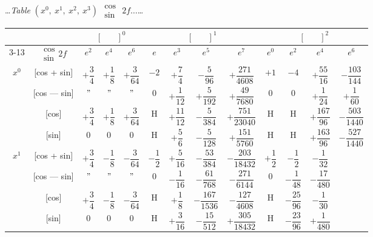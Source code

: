 \documentclass[10pt,a4paper]{article}
\newcommand{\tabletitle}[2]{%
  \begin{center}
  \ldots\textit{Table} #1 $\displaystyle\begin{smallmatrix} \cos \\ \sin \end{smallmatrix}$ #2\ldots
  \end{center}
}
\begin{document}
\vspace{1em}

\tabletitle{$(x^0,\ x^1,\ x^2,\ x^3)$}{$2f\ldots$}

\begin{center}
\small
\begin{tabular}{|c|c|c|c|c|c|c|c|c|c|c|c|c|}
\hline
& & \multicolumn{3}{c|}{$[\phantom{()}]^0$} & \multicolumn{4}{c|}{$[\phantom{()}]^1$} & \multicolumn{4}{c|}{$[\phantom{()}]^2$} \\
\cline{3-13}
& $\begin{smallmatrix} \cos \\ \sin \end{smallmatrix} 2f$ & $e^2$ & $e^4$ & $e^6$ & $e$ & $e^3$ & $e^5$ & $e^7$ & $e^0$ & $e^2$ & $e^4$ & $e^6$ \\
\hline
\multirow{4}{*}{$x^0$} & [cos + sin] & $+\dfrac{3}{4}$ & $+\dfrac{1}{8}$ & $+\dfrac{3}{64}$ & $-2$ & $+\dfrac{7}{4}$ & $-\dfrac{5}{96}$ & $+\dfrac{271}{4608}$ & $+1$ & $-4$ & $+\dfrac{55}{16}$ & $-\dfrac{103}{144}$ \\
& [cos --- sin] & $"$ & $"$ & $"$ & $0$ & $+\dfrac{1}{12}$ & $+\dfrac{5}{192}$ & $+\dfrac{49}{7680}$ & $0$ & $0$ & $+\dfrac{1}{24}$ & $+\dfrac{1}{60}$ \\
& [cos] & $+\dfrac{3}{4}$ & $+\dfrac{1}{8}$ & $+\dfrac{3}{64}$ & H & $+\dfrac{11}{12}$ & $-\dfrac{5}{384}$ & $+\dfrac{751}{23040}$ & H & H & $+\dfrac{167}{96}$ & $-\dfrac{503}{1440}$ \\
& [sin] & $0$ & $0$ & $0$ & H & $+\dfrac{5}{6}$ & $-\dfrac{5}{128}$ & $+\dfrac{151}{5760}$ & H & H & $+\dfrac{163}{96}$ & $-\dfrac{527}{1440}$ \\
\hline
\multirow{4}{*}{$x^1$} & [cos + sin] & $+\dfrac{3}{4}$ & $-\dfrac{1}{8}$ & $-\dfrac{3}{64}$ & $-\dfrac{1}{2}$ & $+\dfrac{5}{16}$ & $-\dfrac{53}{384}$ & $-\dfrac{203}{18432}$ & $+\dfrac{1}{2}$ & $-\dfrac{1}{2}$ & $-\dfrac{1}{32}$ \\
& [cos --- sin] & $"$ & $"$ & $"$ & $0$ & $-\dfrac{1}{16}$ & $-\dfrac{61}{768}$ & $-\dfrac{271}{6144}$ & $0$ & $-\dfrac{1}{48}$ & $-\dfrac{17}{480}$ \\
& [cos] & $+\dfrac{3}{4}$ & $-\dfrac{1}{8}$ & $-\dfrac{3}{64}$ & H & $+\dfrac{1}{8}$ & $-\dfrac{167}{1536}$ & $-\dfrac{127}{4608}$ & H & $-\dfrac{25}{96}$ & $-\dfrac{1}{30}$ \\
& [sin] & $0$ & $0$ & $0$ & H & $+\dfrac{3}{16}$ & $-\dfrac{15}{512}$ & $+\dfrac{305}{18432}$ & H & $-\dfrac{23}{96}$ & $+\dfrac{1}{480}$ \\

\end{tabular}
\end{center}
\end{document}
